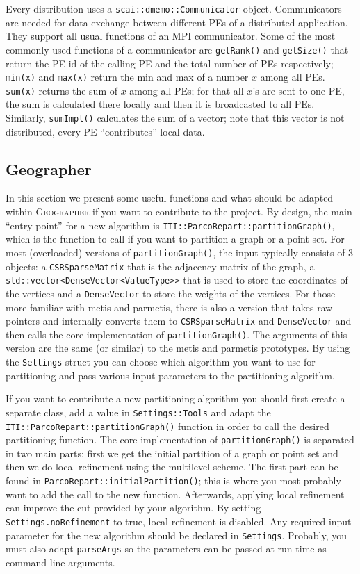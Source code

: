 \documentclass[a4paper,10pt]{article}
\newcommand{\geo}{\textsc{Geographer} }
\newcommand{\quot}[1]{``#1''}
\newcommand{\MI}[1]{\texttt{#1}}
\begin{document}
Every distribution uses a \MI{scai::dmemo::Communicator} object. Communicators are needed for 
data exchange between different PEs of a distributed application. They support all usual functions
of an MPI communicator. Some of the most commonly used functions 
of a communicator are \MI{getRank()} and \MI{getSize()} that return the PE id of the calling PE and the
total number of PEs respectively; \MI{min(x)} and \MI{max(x)} return the min and max of a
number $x$ among all PEs. \MI{sum(x)} returns the sum of $x$ among all PEs; for that all $x$'s are sent to one PE, the
sum is calculated there locally and then it is broadcasted to all PEs. Similarly, \MI{sumImpl()}
calculates the sum of a vector; note that this vector is not distributed, every PE \quot{contributes}
local data.

\clearpage


\subsection*{Geographer }

In this section we present some useful functions and what should be adapted within \geo if you want 
to contribute to the project.
By design, the main \quot{entry point} for a new algorithm is \MI{ITI::ParcoRepart::partitionGraph()}, which
is the function to call if you want to partition a graph or a point set. 
For most (overloaded) versions of \MI{partitionGraph()}, 
the input typically consists of 3 objects: a \MI{CSRSparseMatrix} that is the adjacency matrix of the
graph, a \MI{std::vector<DenseVector<ValueType>>} that is used to store the coordinates of the vertices
and a \MI{DenseVector} to store the weights of the vertices.
For those more familiar with metis and parmetis, there is also a version that takes raw pointers and
internally converts them to \MI{CSRSparseMatrix} and \MI{DenseVector} and then calls the core implementation
of \MI{partitionGraph()}. The arguments of this version are the same (or similar) to the metis and
parmetis prototypes.
By using the \MI{Settings} struct you can choose which algorithm you want to use for partitioning and
pass various input parameters to the partitioning algorithm.

If you want to contribute a new partitioning algorithm
you should first create a separate class, add a value in \MI{Settings::Tools} and  adapt the 
\MI{ITI::ParcoRepart::partitionGraph()} function in order to call the desired partitioning function.
The core implementation of \MI{partitionGraph()} is separated in two main parts: 
first we get the initial partition of a graph or point set and then we do local refinement using 
the multilevel scheme. 
The first part can be found in \MI{ParcoRepart::initialPartition()}; this is where you most probably
want to add the call to the new function. Afterwards, applying
local refinement can improve the cut provided by your algorithm.
By setting \MI{Settings.noRefinement} to true, local refinement is disabled.
Any required input parameter for the new algorithm should be declared in \MI{Settings}.
Probably, you must also adapt \MI{parseArgs} so the parameters can be passed at run time as 
command line arguments.
\end{document}
